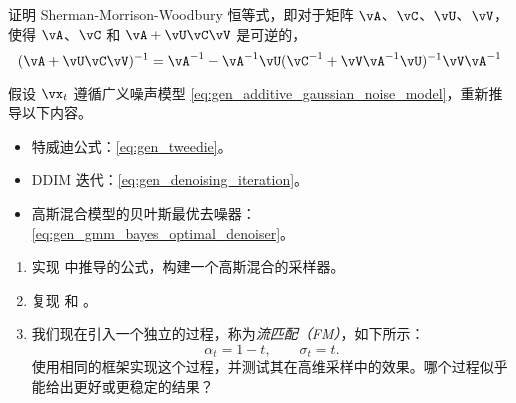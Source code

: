 \documentclass[../../book-main_zh.tex]{subfiles}
\begin{document}
\begin{exercise}
\begin{enumerate}
  \end{enumerate}


\end{exercise}

\begin{exercise}\label{exercise:sherman_morrison_woodbury_identity}
    证明 Sherman-Morrison-Woodbury 恒等式，即对于矩阵 \(\vA\)、\(\vC\)、\(\vU\)、\(\vV\)，使得 \(\vA\)、\(\vC\) 和 \(\vA + \vU\vC\vV\) 是可逆的，
    \begin{equation}
        (\vA + \vU\vC\vV)^{-1} = \vA^{-1} - \vA^{-1}\vU(\vC^{-1} + \vV\vA^{-1}\vU)^{-1}\vV\vA^{-1}
    \end{equation}
\end{exercise}

\begin{exercise}\label{exercise:generalizing_results_to_different_noise_models}
    假设 \(\vx_{t}\) 遵循广义噪声模型 \eqref{eq:gen_additive_gaussian_noise_model}，重新推导以下内容。
    \begin{itemize}
        \item 特威迪公式：\eqref{eq:gen_tweedie}。
        \item DDIM 迭代：\eqref{eq:gen_denoising_iteration}。
        \item 高斯混合模型的贝叶斯最优去噪器：\eqref{eq:gen_gmm_bayes_optimal_denoiser}。
    \end{itemize}
\end{exercise}

\begin{exercise}\label{exercise:implement_denoising_processes}
\begin{enumerate}
    \item 实现  中推导的公式，构建一个高斯混合的采样器。
    \item 复现  和 。
    \item 我们现在引入一个独立的过程，称为\textit{流匹配（FM）}，如下所示：
    \begin{equation}
        \alpha_{t} = 1 - t, \qquad \sigma_{t} = t.
    \end{equation}
    使用相同的框架实现这个过程，并测试其在高维采样中的效果。哪个过程似乎能给出更好或更稳定的结果？
\end{enumerate}
\end{exercise}
\end{document}

